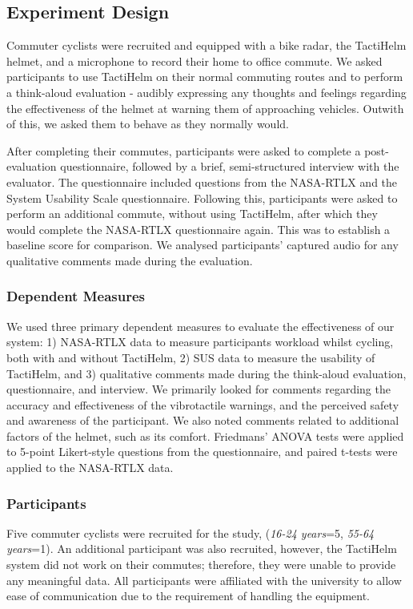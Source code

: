 \documentclass{mpaper}
\begin{document}
\subsection{Experiment Design}
Commuter cyclists were recruited and equipped with a bike radar, the TactiHelm helmet, and a microphone to record their home to office commute. We asked participants to use TactiHelm on their normal commuting routes and to perform a think-aloud evaluation - audibly expressing any thoughts and feelings regarding the effectiveness of the helmet at warning them of approaching vehicles. Outwith of this, we asked them to behave as they normally would.

After completing their commutes, participants were asked to complete a post-evaluation questionnaire, followed by a brief, semi-structured interview with the evaluator. The questionnaire included questions from the NASA-RTLX \cite{doi:10.1177/154193120605000909} and the System Usability Scale \cite{sus} questionnaire. Following this, participants were asked to perform an additional commute, without using TactiHelm, after which they would complete the NASA-RTLX questionnaire again. This was to establish a baseline score for comparison. We analysed participants' captured audio for any qualitative comments made during the evaluation. 

\subsubsection{Dependent Measures}
We used three primary dependent measures to evaluate the effectiveness of our system: 1) NASA-RTLX data to measure participants workload whilst cycling, both with and without TactiHelm, 2) SUS data to measure the usability of TactiHelm, and 3) qualitative comments made during the think-aloud evaluation, questionnaire, and interview. We primarily looked for comments regarding the accuracy and effectiveness of the vibrotactile warnings, and the perceived safety and awareness of the participant. We also noted comments related to additional factors of the helmet, such as its comfort. Friedmans' ANOVA tests were applied to 5-point Likert-style questions from the questionnaire, and paired t-tests were applied to the NASA-RTLX data.

\subsubsection{Participants}
Five commuter cyclists were recruited for the study, (\textit{16-24 years}=5, \textit{55-64 years}=1). An additional participant was also recruited, however, the TactiHelm system did not work on their commutes; therefore, they were unable to provide any meaningful data. All participants were affiliated with the university to allow ease of communication due to the requirement of handling the equipment.
\end{document}
